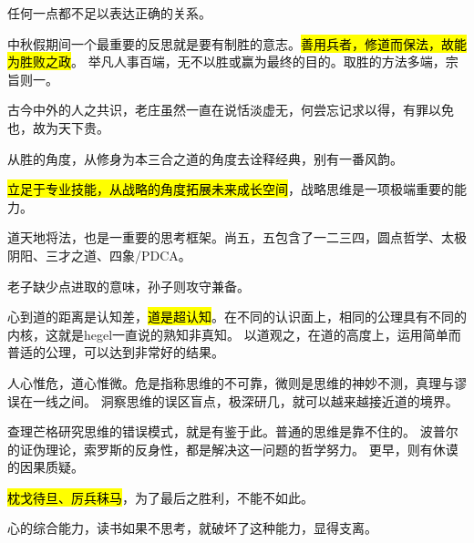 任何一点都不足以表达正确的关系。

中秋假期间一个最重要的反思就是要有制胜的意志。\hl{善用兵者，修道而保法，故能为胜败之政}。
举凡人事百端，无不以胜或赢为最终的目的。取胜的方法多端，宗旨则一。

古今中外的人之共识，老庄虽然一直在说恬淡虚无，何尝忘记求以得，有罪以免也，故为天下贵。

从胜的角度，从修身为本三合之道的角度去诠释经典，别有一番风韵。

\hl{立足于专业技能，从战略的角度拓展未来成长空间}，战略思维是一项极端重要的能力。

道天地将法，也是一重要的思考框架。尚五，五包含了一二三四，圆点哲学、太极阴阳、三才之道、四象/PDCA。

老子缺少点进取的意味，孙子则攻守兼备。

心到道的距离是认知差，\hl{道是超认知}。在不同的认识面上，相同的公理具有不同的内核，这就是hegel一直说的熟知非真知。
以道观之，在道的高度上，运用简单而普适的公理，可以达到非常好的结果。

人心惟危，道心惟微。危是指称思维的不可靠，微则是思维的神妙不测，真理与谬误在一线之间。
洞察思维的误区盲点，极深研几，就可以越来越接近道的境界。

查理芒格研究思维的错误模式，就是有鉴于此。普通的思维是靠不住的。
波普尔的证伪理论，索罗斯的反身性，都是解决这一问题的哲学努力。
更早，则有休谟的因果质疑。

\hl{枕戈待旦、厉兵秣马}，为了最后之胜利，不能不如此。

心的综合能力，读书如果不思考，就破坏了这种能力，显得支离。
